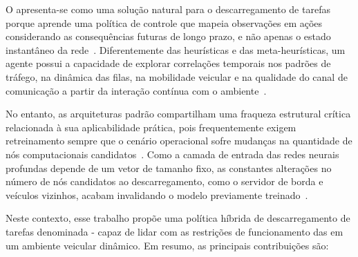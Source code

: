 O  apresenta-se como uma solução natural para o descarregamento de tarefas porque aprende uma política de controle que mapeia observações em ações considerando as consequências futuras de longo prazo, e não apenas o estado instantâneo da rede~\cite{liu2019,shi2023}. Diferentemente das heurísticas e das meta-heurísticas, um agente  possui a capacidade de explorar correlações temporais nos padrões de tráfego, na dinâmica das filas, na mobilidade veicular e na qualidade do canal de comunicação a partir da interação contínua com o ambiente~\cite{li2025drl_survey,uddin2025}. 

No entanto, as arquiteturas  padrão compartilham uma fraqueza estrutural crítica relacionada à sua aplicabilidade prática, pois frequentemente exigem retreinamento sempre que o cenário operacional sofre mudanças na quantidade de nós computacionais candidatos~\cite{miriyala2026dl_offload_review}. Como a camada de entrada das redes neurais profundas depende de um vetor de tamanho fixo, as constantes alterações no número de nós candidatos ao descarregamento, como o servidor de borda e veículos vizinhos, acabam invalidando o modelo previamente treinado~\cite{uddin2025}.


Neste contexto, esse trabalho propõe uma política híbrida de descarregamento de tarefas denominada - capaz de lidar com as restrições de funcionamento das  em um ambiente veicular dinâmico. Em resumo, as principais contribuições são:

